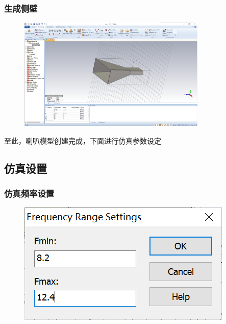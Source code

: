 \documentclass{../source/zjureport}
\begin{document}
            \subsubsection{生成侧壁}
            \begin{figure}[thp]
                \centering
                \includegraphics[width = 0.8\textwidth]{figure/掏空后.png}
            \end{figure}

            至此，喇叭模型创建完成，下面进行仿真参数设定

        \subsection{仿真设置}
            \subsubsection{仿真频率设置}
            \begin{figure}[thp]
                \centering
                \includegraphics[]{figure/仿真频率.png}
            \end{figure}
            \newpage
\end{document}
